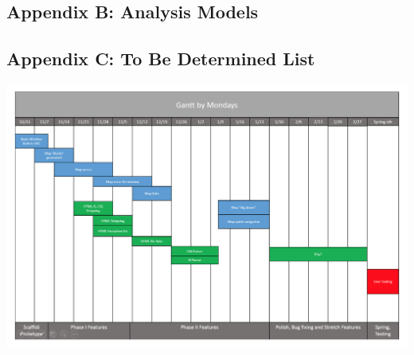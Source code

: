 \documentclass[letterpaper,10pt,titlepage,draftclsnofoot,onecolumn] {IEEEtran}
\begin{document}
\subsection{Appendix B: Analysis Models}

\subsection{Appendix C: To Be Determined List}

\pagebreak

\includegraphics[scale=0.7]{gantt.png}
\end{document}
